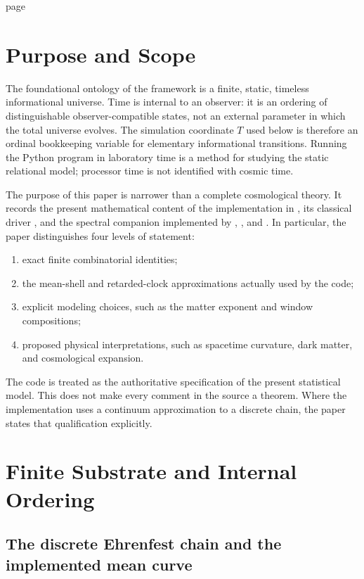 \documentclass[11pt]{article}
\begin{document}
\tableofcontents
\new page

\section{Purpose and Scope}
\label{sec:scope}

The foundational ontology of the framework is a finite, static, timeless
informational universe.  Time is internal to an observer: it is an ordering
of distinguishable observer-compatible states, not an external parameter in
which the total universe evolves.  The simulation coordinate $T$ used below
is therefore an ordinal bookkeeping variable for elementary informational
transitions.  Running the Python program in laboratory time is a method for
studying the static relational model; processor time is not identified with
cosmic time.

The purpose of this paper is narrower than a complete cosmological theory.
It records the present mathematical content of the implementation in
, its classical driver , and the
spectral companion implemented by ,
, and .  In particular, the
paper distinguishes four levels of statement:
\begin{enumerate}
  \item exact finite combinatorial identities;
  \item the mean-shell and retarded-clock approximations actually used by
        the code;
  \item explicit modeling choices, such as the matter exponent and window
        compositions;
  \item proposed physical interpretations, such as spacetime curvature,
        dark matter, and cosmological expansion.
\end{enumerate}

The code is treated as the authoritative specification of the present
statistical model.  This does not make every comment in the source a theorem.
Where the implementation uses a continuum approximation to a discrete chain,
the paper states that qualification explicitly.

\section{Finite Substrate and Internal Ordering}
\label{sec:substrate}

\subsection{The discrete Ehrenfest chain and the implemented mean curve}
\end{document}

